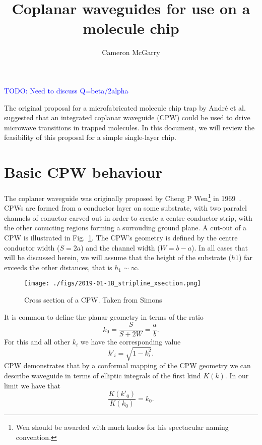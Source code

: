 \documentclass[a4paper]{article}
\title{Coplanar waveguides for use on a molecule chip}
\author{Cameron McGarry}
\newcommand{\cm}[1]{\textcolor{blue}{#1}} %
\begin{document}
\maketitle

\cm{TODO: Need to discuss Q=beta/2alpha}

The original proposal for a microfabricated molecule chip trap by Andr\'e et
al.~\cite{Andre2006} suggested that an integrated coplanar waveguide (CPW) could
be used to drive microwave transitions in trapped molecules. In this document,
we will review the feasibility of this proposal for a simple single-layer chip.

\section{Basic CPW behaviour}

The coplaner waveguide was originally proposed by Cheng P Wen\footnote{Wen
should be awarded with much kudos for his spectacular naming convention.} in
1969~\cite{1127105}. CPWs are formed from a conductor layer on some substrate,
with two parralel channels of conuctor carved out in order to create a centre
conductor strip, with the other conucting regions forming a surrouding ground
plane. A cut-out of a CPW is illustrated in Fig.~\ref{fig:CPWxsec}. The CPW's
geometry is defined by the centre conductor width ($S=2a$) and the channel width
($W=b-a$). In all cases that will be discussed herein, we will assume that the
height of the substrate ($h1$) far exceeds the other distances, that is $h_1
\sim \infty$.

\begin{figure}
  \texttt{[image: ./figs/2019-01-18\_stripline\_xsection.png]}
  \caption{Cross section of a CPW. Taken from Simons~\cite{Simons2004}}
  \label{fig:CPWxsec}
\end{figure}

It is common to define the planar geometry in terms of the ratio
\begin{equation}
  k_0 = \frac{S}{S+2W} = \frac{a}{b}.
  \label{eqn:k0def}
\end{equation}
For this and all other $k_i$ we have the corresponding value
\begin{equation}
  k'_i = \sqrt{1-k^2_i}.
\end{equation}
CPW demonstrates\cite{1127105} that by a conformal mapping of the CPW geometry
we can describe waveguide in terms of elliptic integrals of the first kind
$K(k)$. In our limit we have that
\begin{equation}
  \frac{K(k'_0)}{K(k_0)} = k_0.
  \label{eqn:k0rat}
\end{equation}
\end{document}
